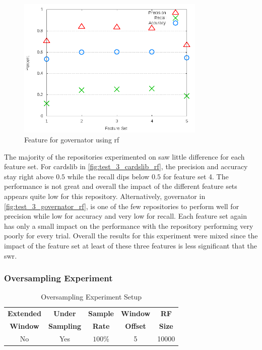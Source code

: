 \begin{figure}[!ht]
    \centering
        \includegraphics[width=0.8\textwidth]{images/rf/test_3/governator_sample_range}
    \caption{Feature for governator using \gls{rf}}
    \label{fig:test_3_governator_rf}
\end{figure}

The majority of the repositories experimented on saw little difference for each feature set. For cardslib in \autoref{fig:test_3_cardslib_rf}, the precision and accuracy stay right above $0.5$ while the recall dips below $0.5$ for feature set 4. The performance is not great and overall the impact of the different feature sets appears quite low for this repository. Alternatively, governator in \autoref{fig:test_3_governator_rf}, is one of the few repositories to perform well for precision while low for accuracy and very low for recall. Each feature set again has only a small impact on the performance with the repository performing very poorly for every trial. Overall the results for this experiment were mixed since the impact of the feature set at least of these three features is less significant that the \gls{swr}.

\subsubsection{Oversampling Experiment}
\label{sec:oversampling_experiment_rf}

\begin{table}[h]
\begin{center}

    \begin{tabular}{|c|c|c|c|c|}
        \hline
        \textbf{Extended} & \textbf{Under} & \textbf{Sample} & \textbf{Window} & \textbf{RF} \\
        \textbf{Window} & \textbf{Sampling} & \textbf{Rate} & \textbf{Offset} & \textbf{Size} \\ \hline
        No & Yes & $100\%$ & 5 & 10000 \\ \hline
    \end{tabular}
    \caption{Oversampling Experiment Setup}
    \label{tab:rf_os_experiment_setup}
\end{center}

\end{table}


